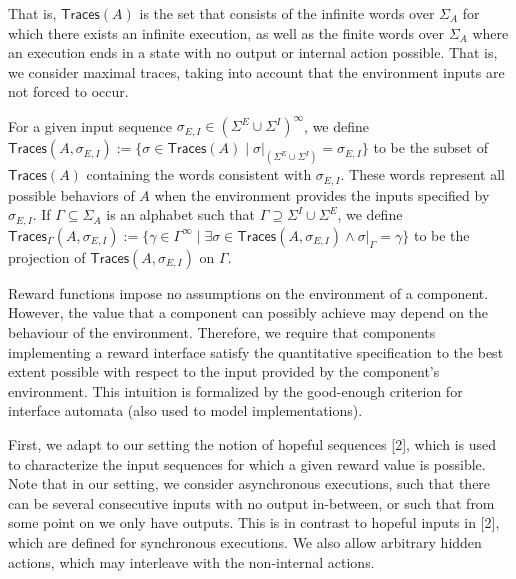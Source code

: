 That is, $\mathsf{Traces}(A)$ is the set that consists of the infinite words over $\Sigma_{A}$ for which there exists an infinite execution, as well as the finite words over $\Sigma_{A}$ where an execution ends in a state with no output or internal action possible. That is, we consider maximal traces, taking into account that the environment inputs are not forced to occur.\par
 
 
 
For a given input sequence $\sigma_{E,I}\in(\Sigma^{E}\cup\Sigma^{I})^{\infty}$, we define $\mathsf{Traces}(A,\sigma_{E,I}):=\{\sigma\in\mathsf{Traces}(A)\mid\sigma|_{(\Sigma^{E}\cup\Sigma^{I})}=\sigma_{E,I}\}$ to be the subset of $\mathsf{Traces}(A)$ containing the words consistent with $\sigma_{E,I}$. These words represent all possible behaviors of $A$ when the environment provides the inputs specified by $\sigma_{E,I}$. If $\Gamma\subseteq\Sigma_{A}$ is an alphabet such that $\Gamma\supseteq\Sigma^{I}\cup\Sigma^{E}$, we define $\mathsf{Traces}_{\Gamma}(A,\sigma_{E,I}):=\{\gamma\in\Gamma^{\infty}\mid\exists\sigma\in\mathsf{Traces}(A,\sigma_{E,I})\land\sigma|_{\Gamma}=\gamma\}$ to be the projection of $\mathsf{Traces}(A,\sigma_{E,I})$ on $\Gamma$.\par
 
 
 
Reward functions impose no assumptions on the environment of a component. However, the value that a component can possibly achieve may depend on the behaviour of the environment. Therefore, we require that components implementing a reward interface satisfy the quantitative specification to the best extent possible with respect to the input provided by the component’s environment. This intuition is formalized by the good-enough criterion for interface automata (also used to model implementations).\par
 
 
 
First, we adapt to our setting the notion of hopeful sequences [2], which is used to characterize the input sequences for which a given reward value is possible. Note that in our setting, we consider asynchronous executions, such that there can be several consecutive inputs with no output in-between, or such that from some point on we only have outputs. This is in contrast to hopeful inputs in [2], which are defined for synchronous executions. We also allow arbitrary hidden actions, which may interleave with the non-internal actions.\par
 
